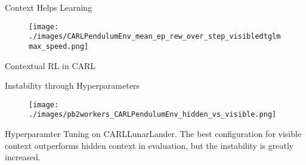 \documentclass[aspectratio=169]{../latex_main/tntbeamer}  %
\begin{document}
\begin{frame}[c]{Context Helps Learning~}

\begin{figure}
    \centering
    \texttt{[image: ./images/CARLPendulumEnv\_mean\_ep\_rew\_over\_step\_visibledtglmmax\_speed.png]}
    
    \label{fig:my_label}
\end{figure}
\centering Contextual RL in CARL

\end{frame}

\begin{frame}[c]{Instability through Hyperparameters~}

\begin{figure}
    \centering
    \texttt{[image: ./images/pb2workers\_CARLPendulumEnv\_hidden\_vs\_visible.png]}
    \label{fig:my_label}
\end{figure}
\centering Hyperparamter Tuning on CARLLunarLander. The best configuration for visible context outperforms hidden context in evaluation, but the instability is greatly increased.

\end{frame}
\end{document}
